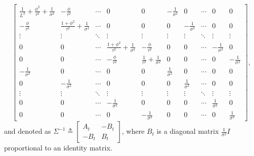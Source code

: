 \begin{equation}
\begin{bmatrix}
\frac{1}{L^2}+\frac{\phi^2}{\tau^2} +\frac{1}{\sigma^2} & -\frac{\phi}{\tau^2}  & \cdots & 0 & 0 & -\frac{1}{\sigma^2}  & 0 & \cdots & 0 & 0 \\
-\frac{\phi}{\tau^2}   & \frac{1+\phi^2}{\tau^2}+\frac{1}{\sigma^2}  & \cdots & 0 & 0 & 0 & -\frac{1}{\sigma^2} & \cdots & 0 & 0 \\
\vdots & \vdots & \ddots & \vdots & \vdots & \vdots & \vdots & \ddots & \vdots & \vdots \\
0 & 0  &  \cdots & \frac{1+\phi^2}{\tau^2} + \frac{1}{\sigma^2} & -\frac{\phi}{\tau^2} & 0 & 0 & \cdots & -\frac{1}{\sigma^2} & 0 \\
0 & 0   &  \cdots & -\frac{\phi}{\tau^2}  & \frac{1}{\tau^2}+\frac{1}{\sigma^2} & 0 & 0 & \cdots & 0 & -\frac{1}{\sigma^2}\\
-\frac{1}{\sigma^2}  & 0 & \cdots & 0 & 0 & \frac{1}{\sigma^2} & 0 & \cdots & 0 & 0\\
0&-\frac{1}{\sigma^2}   & \cdots & 0 & 0 & 0 &  \frac{1}{\sigma^2} & \cdots & 0& 0\\
\vdots & \vdots & \ddots & \vdots & \vdots & \vdots & \vdots & \ddots & \vdots &  \vdots\\
0 & 0& \cdots &-\frac{1}{\sigma^2} & 0 &  0 & 0 & \cdots &  \frac{1}{\sigma^2}  & 0\\ 
0 & 0& \cdots & 0 & -\frac{1}{\sigma^2} & 0 & 0 & \cdots & 0 &  \frac{1}{\sigma^2}
\end{bmatrix},
\end{equation}\label{precisionMatrix}
and denoted as $\Sigma^{-1}\triangleq\begin{bmatrix} A_t & -B_t \\ -B_t & B_t \end{bmatrix}$, 
where $B_t$ is a diagonal matrix $\frac{1}{\sigma^2}I$ proportional to an identity matrix. 


